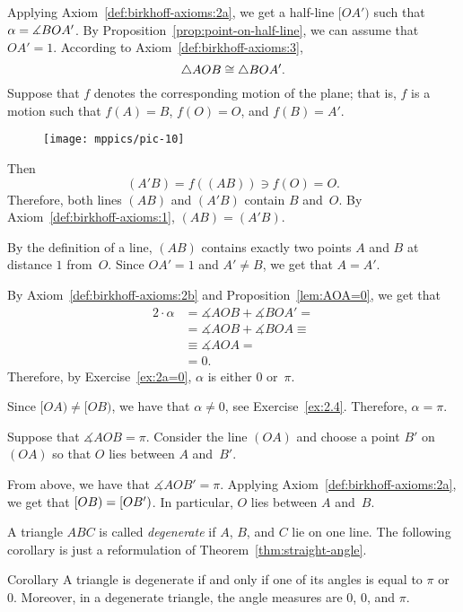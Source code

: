 Applying Axiom~\ref{def:birkhoff-axioms:2a},
we get a half-line $[OA')$ such that $\alpha=\measuredangle B O A'$.
By Proposition~\ref{prop:point-on-half-line}, we can assume that $OA'=1$.
According to Axiom~\ref{def:birkhoff-axioms:3},
\[\triangle AOB\cong\triangle BOA'.\]
Suppose that $f$ denotes the corresponding motion of the plane;
that is, $f$ is a motion such that $f(A)=B$, $f(O)=O$, and $f(B)=A'$. 

\begin{wrapfigure}{o}{40mm}
\centering
\texttt{[image: mppics/pic-10]}
\end{wrapfigure}

Then 
\[(A'B)=f((AB))\ni f(O)=O.\]
Therefore, both lines $(AB)$ and $(A'B)$ contain $B$ and~$O$.
By Axiom~\ref{def:birkhoff-axioms:1}, $(AB)=(A'B)$.

By the definition of a line,
$(AB)$ contains exactly two points $A$ and $B$ at distance $1$ from~$O$.
Since $OA'=1$ and $A'\ne B$, we get that $A=A'$.

By Axiom~\ref{def:birkhoff-axioms:2b} and Proposition~\ref{lem:AOA=0}, we get that
\begin{align*}
2\cdot\alpha&=
\measuredangle AOB+\measuredangle BOA'=
\\
&=\measuredangle AOB+\measuredangle BOA\equiv
\\
&\equiv\measuredangle AOA=
\\
&= 0.
\end{align*}
Therefore, by Exercise~\ref{ex:2a=0}, $\alpha$ is either $0$ or~$\pi$.

Since $[OA)\ne [OB)$,  
we have that $\alpha\ne 0$, see Exercise~\ref{ex:2.4}.
Therefore, $\alpha=\pi$.


Suppose that $\measuredangle A O B= \pi$.
Consider the line $(OA)$ and choose a point $B'$ on $(OA)$ so that $O$ lies between $A$ and~$B'$.

From above, we have that $\measuredangle AOB'=\pi$.
Applying Axiom~\ref{def:birkhoff-axioms:2a}, 
we get that $[O B)=[O B')$.
In particular, $O$ lies between $A$ and~$B$.
\qeds 

A triangle $ABC$ is called 
\emph{degenerate}
if $A$, $B$, and $C$ lie on one line.
The following corollary is just a reformulation of Theorem~\ref{thm:straight-angle}.

\begin{thm}[\abs]{Corollary}\label{cor:degenerate=pi}
A triangle is degenerate if and only if one of its angles is equal to $\pi$ or~$0$.
Moreover, in a degenerate triangle, the angle measures are $0$, $0$, and $\pi$.
\end{thm}

